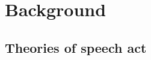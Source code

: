 \chapter{Background}
\label{chap:background}


\section{Theories of speech act} \label{sec:bg:theory}




\begin{comment}
The generative tradition avoids this problem by proposing a formal feature or an affix for clause types that resides in $C^{0}$ (or its equivalents). For example \textcite{chomsky1995minimalist} (following \textcite{katzpostal1964, baker1970int}) propose that interrogative sentences have a phonetically null affix Q that prompts subject-auxiliary inversion and \twh-movements. As Q is a clausal feature, it can appear in embedded clauses as well.  Additionally, Q is a strong feature that must be checked by PF (phonetic form). Consequently, Q requires an overt head, realized by auxiliary raising over the subject to $C^{0}$, creating subject-auxiliary inversion. If $C^{0}$ is Q, there is a strong [+wh] in [Spec, CP]. In English this strong [+wh] feature must be checked via specifier-head agreement, triggering the \twh-phrases to move to [Spec, CP]. 

Later Q is replaced by features like [+int], but the intuition that interrogative clauses have a strong feature/affix that is phonetically null and changes the force of the sentence is preserved. Similarly, imperatives are anlayzed as having an [+imp] feature in $C^{0}$. Under this approach, declaratives are the default clause type [$-$int, $-$imp]. 

Additionally, many assume that every clause must be associated with a clause type feature (\cite{chomskylasnik1977, cheng1991} among others). Therefore, learners must figure out what morpho-syntactic cues are associated with each clause type features. We will return to how learners could learn the clause type features and their corresponding morpho-syntactic properties. %

This knowledge, that the presence of subject-auxiliary inversion indicates a [+int] and not [-int] value of $C^{0}$, has to be learned from the input and likewise for other surface formal properties relevant for clause typing. This is because the relevant properties indicative of the value of $C^{0}$ (and the clause type category of the sentence) differ from language to language. For example, as we will discuss in detail in the next chapter, Mandarin-acquiring infants, unlike English-acquiring infants, need to pick out that [+int] is expressed by the presence of a sentence-final particle, specifically the particle \tit{ma}, and hence should use this surface feature to cluster sentences into clause types.




\end{comment}
